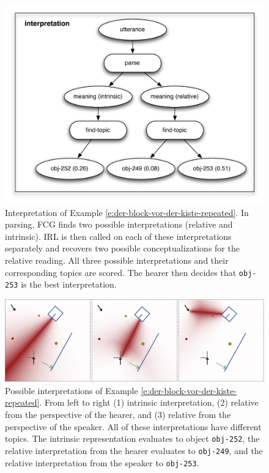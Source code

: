\begin{figure}
\begin{center}
\includegraphics[width=0.86\columnwidth]{figs/semantic-ambiguity-interpretation}
\end{center}
\caption[Interpretation example schematic]{
Interpretation of Example \ref{e:der-block-vor-der-kiste-repeated}. In parsing,
FCG finds two possible interpretations (relative and intrinsic). IRL is then called 
on each of these interpretations separately and recovers 
two possible conceptualizations for the relative reading. All three
possible interpretations and their corresponding topics are scored. 
The hearer then decides that {\footnotesize\tt obj-253} is the best interpretation.}
\label{f:processing-interpretations}
\end{figure}



\begin{figure}
\begin{center}
\includegraphics[width=0.95\columnwidth]{figs/semantic-ambiguity-interpretations.png}
\end{center}
\caption[Interpretation example graphic]{Possible interpretations of Example \ref{e:der-block-vor-der-kiste-repeated}.
From left to right (1) intrinsic interpretation, (2) relative from the perspective of the hearer,
and (3) relative from the perspective of the speaker. All of these interpretations have
different topics. The intrinsic representation evaluates to object {\footnotesize\tt obj-252},
the relative interpretation from the hearer evaluates to {\footnotesize\tt obj-249}, and
the relative interpretation from the speaker to {\footnotesize\tt obj-253}.}
\label{f:interpretations}
\end{figure}


